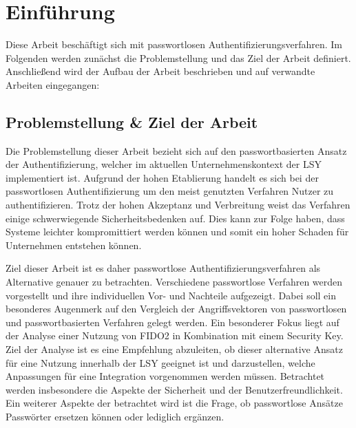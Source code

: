 
\chapter{Einführung}
Diese Arbeit beschäftigt sich mit passwortlosen Authentifizierungsverfahren. Im Folgenden werden zunächst die Problemstellung und das Ziel der Arbeit definiert. Anschließend wird der Aufbau der Arbeit beschrieben und auf verwandte Arbeiten eingegangen:

\section{Problemstellung \& Ziel der Arbeit} \label{target}
Die Problemstellung dieser Arbeit bezieht sich auf den passwortbasierten Ansatz der Authentifizierung, welcher im aktuellen Unternehmenskontext der \ac{LSY} implementiert ist. Aufgrund der hohen Etablierung handelt es sich bei der passwortlosen Authentifizierung um den meist genutzten Verfahren Nutzer zu authentifizieren. Trotz der hohen Akzeptanz und Verbreitung weist das Verfahren einige schwerwiegende Sicherheitsbedenken auf. Dies kann zur Folge haben, dass Systeme leichter kompromittiert werden können und somit ein hoher Schaden für Unternehmen entstehen können.

Ziel dieser Arbeit ist es daher passwortlose Authentifizierungsverfahren als Alternative genauer zu betrachten. Verschiedene passwortlose Verfahren werden vorgestellt und ihre individuellen Vor- und Nachteile aufgezeigt. Dabei soll ein besonderes Augenmerk auf den Vergleich der Angriffsvektoren von passwortlosen und passwortbasierten Verfahren gelegt werden. Ein besonderer Fokus liegt auf der Analyse einer Nutzung von \ac{FIDO}2 in Kombination mit einem Security Key. Ziel der Analyse ist es eine Empfehlung abzuleiten, ob dieser alternative Ansatz für eine Nutzung innerhalb der \ac{LSY} geeignet ist und darzustellen, welche Anpassungen für eine Integration vorgenommen werden müssen. Betrachtet werden insbesondere die Aspekte der Sicherheit und der Benutzerfreundlichkeit. Ein weiterer Aspekte der betrachtet wird ist die Frage, ob passwortlose Ansätze Passwörter ersetzen können oder lediglich ergänzen. 

